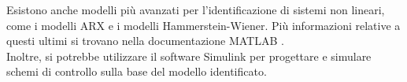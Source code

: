 Esistono anche modelli più avanzati per l'identificazione di sistemi non lineari, come i modelli ARX e i modelli Hammerstein-Wiener. Più informazioni relative a questi ultimi si trovano nella documentazione MATLAB \cite{sysIdMatArt} \cite{sysID}.\\

Inoltre, si potrebbe utilizzare il software Simulink \cite{simulink} per progettare e simulare schemi di controllo sulla base del modello identificato.
